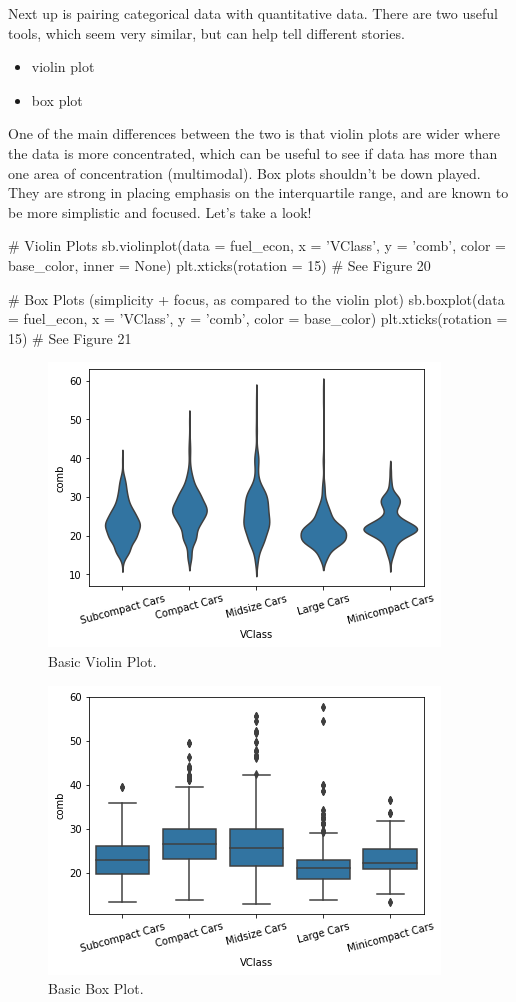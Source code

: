 Next up is pairing categorical data with quantitative data. There are two useful tools, which seem very similar, but can help tell different stories.

\begin{itemize}
	\item violin plot
	\item box plot
\end{itemize}

One of the main differences between the two is that violin plots are wider where the data is more concentrated, which can be useful to see if data has more than one area of concentration (multimodal). Box plots shouldn't be down played. They are strong in placing emphasis on the interquartile range, and are known to be more simplistic and focused. Let's take a look!

\begin{python}
	# Violin Plots
	sb.violinplot(data = fuel_econ, x = 'VClass', y = 'comb', color = base_color, inner = None)
	plt.xticks(rotation = 15)
	# See Figure 20
	
	# Box Plots (simplicity + focus, as compared to the violin plot)
	sb.boxplot(data = fuel_econ, x = 'VClass', y = 'comb', color = base_color)
	plt.xticks(rotation = 15)
	# See Figure 21
\end{python}

\begin{figure}
	\includegraphics{images/figure20.png}
	\caption{Basic Violin Plot.}\label{fig:figure20}
\end{figure}

\begin{figure}
	\includegraphics{images/figure21.png}
	\caption{Basic Box Plot.}\label{fig:figure21}
\end{figure}


